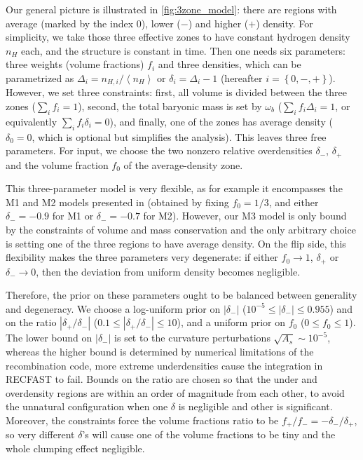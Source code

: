 Our general picture is illustrated in \cref{fig:3zone_model}: there are regions with average (marked by the index $0$), lower ($-$) and higher ($+$) density. 
For simplicity, we take those three effective zones to have constant hydrogen density $n_H$ each, and the structure is constant in time.
Then one needs six parameters: three weights (volume fractions) $f_i$ and three densities, which can be parametrized as $\Delta_i=n_{H,i}/ \left\langle n_H \right\rangle$ or $\delta_i=\Delta_i-1$ (hereafter $i=\left\{ 0,-,+ \right\}$).
However, we set three constraints: first, all volume is divided between the three zones ($\sum_i f_i=1$), second, the total baryonic mass is set by $\omega_b$ ($\sum_i f_i \Delta_i=1$, or equivalently $\sum_i f_i \delta_i=0$), and finally, one of the zones has average density ($\delta_0=0$, which is optional but simplifies the analysis).
This leaves three free parameters.
For input, we choose the two nonzero relative overdensities $\delta_-$, $\delta_+$ and the volume fraction $f_0$ of the average-density zone.

This three-parameter model is very flexible, as for example it encompasses the M1 and M2 models presented in \citet{JP20} (obtained by fixing $f_0=1/3$, and either $\delta_-=-0.9$ for M1 or $\delta_-=-0.7$ for M2).
However, our M3 model is only bound by the constraints of volume and mass conservation and the only arbitrary choice is setting one of the three regions to have average density.
On the flip side, this flexibility makes the three parameters very degenerate: if either $f_0\rightarrow 1$, $\delta_+$ or $\delta_-\rightarrow 0$, then the deviation from uniform density becomes negligible.

Therefore, the prior on these parameters ought to be balanced between generality and degeneracy. 
We choose a log-uniform prior on $\left| \delta_- \right|$ ($10^{-5}\le \left| \delta_- \right|\le 0.955$) and on the ratio $\left| \delta_+/\delta_- \right|$ ($0.1\le\left| \delta_+/\delta_- \right|\le 10$), and a uniform prior on $f_0$ ($0\le f_0\le 1$).
The lower bound on $|\delta_-|$ is set to the curvature perturbations $\sqrt{A_s}\sim 10^{-5}$, whereas the higher bound is determined by numerical limitations of the recombination code, more extreme underdensities cause the integration in RECFAST to fail.
Bounds on the ratio are chosen so that the under and overdensity regions are within an order of magnitude from each other, to avoid the unnatural configuration when one $\delta$ is negligible and other is significant.
Moreover, the constraints force the volume fractions ratio to be $f_+/f_-=-\delta_-/\delta_+$, so very different $\delta$'s will cause one of the volume fractions to be tiny and the whole clumping effect negligible.


